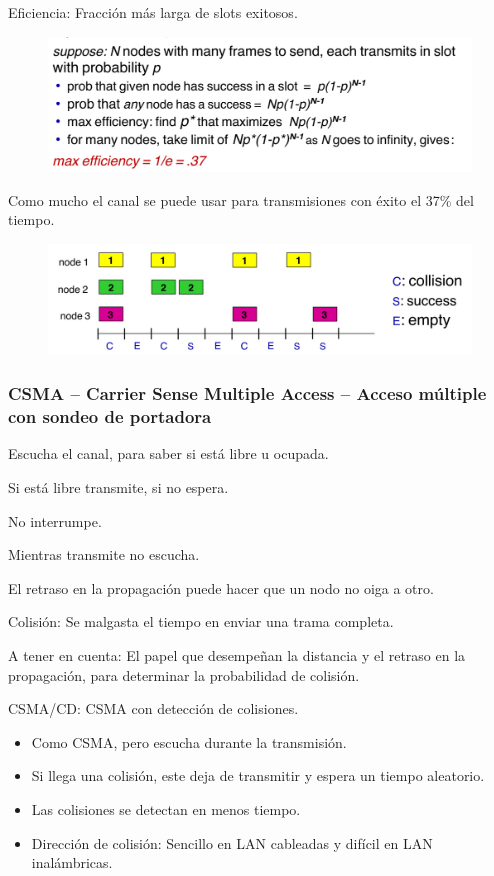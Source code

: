 \documentclass[12pt, twoside, openright]{report} %
\begin{document}
Eficiencia: Fracción más larga de slots exitosos.
\begin{figure}[H]
	{\includegraphics[scale=.25]{Untitled 51.png}}
\end{figure}
Como mucho el canal se puede usar para transmisiones con éxito
el 37\% del tiempo.
\begin{figure}[H]
	{\includegraphics[scale=.25]{Untitled 52.png}}
\end{figure}

\subsubsection{CSMA -- Carrier Sense Multiple Access -- Acceso múltiple con
	sondeo de portadora}



Escucha el canal, para saber si está libre u ocupada.

Si está libre transmite, si no espera.

No interrumpe.

Mientras transmite no escucha.

El retraso en la propagación puede hacer que un nodo no oiga a
otro.

Colisión: Se malgasta el tiempo en enviar una trama completa.

A tener en cuenta: El papel que desempeñan la distancia y el
retraso en la propagación, para determinar la probabilidad de
colisión.

CSMA/CD: CSMA con detección de colisiones.

\begin{itemize}
	\item Como CSMA, pero escucha durante la transmisión.
	\item Si llega una colisión, este deja de transmitir y espera un
	      tiempo aleatorio.
	\item Las colisiones se detectan en menos tiempo.
	\item Dirección de colisión: Sencillo en LAN cableadas y difícil
	      en LAN inalámbricas.
\end{itemize}
\end{document}
